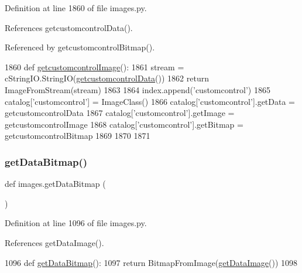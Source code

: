 Definition at line 1860 of file images.\+py.



References getcustomcontrol\+Data().



Referenced by getcustomcontrol\+Bitmap().


\begin{DoxyCode}
1860 \textcolor{keyword}{def }\hyperlink{namespaceimages_a25901646c16edc9965eeb7352b5442ac}{getcustomcontrolImage}():
1861     stream = cStringIO.StringIO(\hyperlink{namespaceimages_a24e2aa03f0ee46b3385dfd337dbc2d1c}{getcustomcontrolData}())
1862     \textcolor{keywordflow}{return} ImageFromStream(stream)
1863 
1864 index.append(\textcolor{stringliteral}{'customcontrol'})
1865 catalog[\textcolor{stringliteral}{'customcontrol'}] = ImageClass()
1866 catalog[\textcolor{stringliteral}{'customcontrol'}].getData = getcustomcontrolData
1867 catalog[\textcolor{stringliteral}{'customcontrol'}].getImage = getcustomcontrolImage
1868 catalog[\textcolor{stringliteral}{'customcontrol'}].getBitmap = getcustomcontrolBitmap
1869 
1870 
1871 \end{DoxyCode}
\mbox{\label{namespaceimages_ac5e2fd592a34c8a0a281d5a6744c81e0}} 
\subsubsection{\texorpdfstring{get\+Data\+Bitmap()}{getDataBitmap()}}
{\footnotesize\ttfamily def images.\+get\+Data\+Bitmap (\begin{DoxyParamCaption}{ }\end{DoxyParamCaption})}



Definition at line 1096 of file images.\+py.



References get\+Data\+Image().


\begin{DoxyCode}
1096 \textcolor{keyword}{def }\hyperlink{namespaceimages_ac5e2fd592a34c8a0a281d5a6744c81e0}{getDataBitmap}():
1097     \textcolor{keywordflow}{return} BitmapFromImage(\hyperlink{namespaceimages_a2e4a6f1439de847a5ce440e0ea37edaa}{getDataImage}())
1098 
\end{DoxyCode}
\mbox{\label{namespaceimages_ab1c77e22e2c32cd1bf3bb8fe77f8298d}} 
